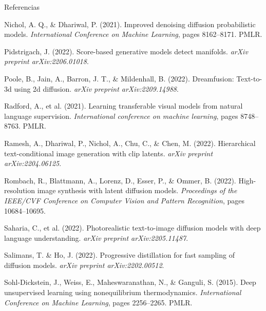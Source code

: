 \documentclass[aspectratio=169,xcolor=dvipsnames, t, spanish]{beamer}
\begin{document}
\begin{frame}{Referencias}
{\begin{thebibliography}{99}
                 Nichol, A. Q., \& Dhariwal, P. (2021).
                \newblock Improved denoising diffusion probabilistic models.
                \newblock \emph{International Conference on Machine Learning}, pages 8162–8171. PMLR.
    
                 Pidstrigach, J. (2022).
                \newblock Score-based generative models detect manifolds.
                \newblock \emph{arXiv preprint arXiv:2206.01018}.
    
                 Poole, B., Jain, A., Barron, J. T., \& Mildenhall, B. (2022).
                \newblock Dreamfusion: Text-to-3d using 2d diffusion.
                \newblock \emph{arXiv preprint arXiv:2209.14988}.
    
                 Radford, A., et al. (2021).
                \newblock Learning transferable visual models from natural language supervision.
                \newblock \emph{International conference on machine learning}, pages 8748–8763. PMLR.
    
                 Ramesh, A., Dhariwal, P., Nichol, A., Chu, C., \& Chen, M. (2022).
                \newblock Hierarchical text-conditional image generation with clip latents.
                \newblock \emph{arXiv preprint arXiv:2204.06125}.
    
                 Rombach, R., Blattmann, A., Lorenz, D., Esser, P., \& Ommer, B. (2022).
                \newblock High-resolution image synthesis with latent diffusion models.
                \newblock \emph{Proceedings of the IEEE/CVF Conference on Computer Vision and Pattern Recognition}, pages 10684–10695.
    
                 Saharia, C., et al. (2022).
                \newblock Photorealistic text-to-image diffusion models with deep language understanding.
                \newblock \emph{arXiv preprint arXiv:2205.11487}.
    
                 Salimans, T. \& Ho, J. (2022).
                \newblock Progressive distillation for fast sampling of diffusion models.
                \newblock \emph{arXiv preprint arXiv:2202.00512}.
                
                 Sohl-Dickstein, J., Weiss, E., Maheswaranathan, N., \& Ganguli, S. (2015).
                \newblock Deep unsupervised learning using nonequilibrium thermodynamics.
                \newblock \emph{International Conference on Machine Learning}, pages 2256–2265. PMLR.
    

\end{thebibliography}}
\end{frame}
\end{document}
